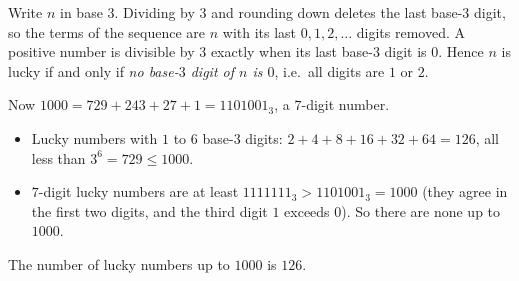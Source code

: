 Write $n$ in base $3$. Dividing by $3$ and rounding down deletes the last base-$3$ digit, so the terms of the sequence are $n$ with its last $0,1,2,\dots$ digits removed. A positive number is divisible by $3$ exactly when its last base-$3$ digit is $0$. Hence $n$ is lucky if and only if \emph{no base-$3$ digit of $n$ is $0$}, i.e.\ all digits are $1$ or $2$.

Now $1000=729+243+27+1=1101001_3$, a $7$-digit number.
\begin{itemize}
\item Lucky numbers with $1$ to $6$ base-$3$ digits: $2+4+8+16+32+64=126$, all less than $3^6=729\le1000$.
\item $7$-digit lucky numbers are at least $1111111_3>1101001_3=1000$ (they agree in the first two digits, and the third digit $1$ exceeds $0$). So there are none up to $1000$.
\end{itemize}
The number of lucky numbers up to $1000$ is $\boxed{126}$.
